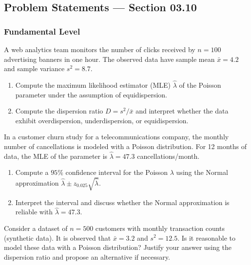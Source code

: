 
\subsection*{Problem Statements --- Section 03.10}

\subsubsection*{Fundamental Level}

\begin{problema}
	\label{prob:3.10.1}
	A web analytics team monitors the number of clicks received by $n = 100$ advertising banners in one hour. The observed data have sample mean $\bar{x} = 4.2$ and sample variance $s^{2} = 8.7$.
	\begin{enumerate}
		\item Compute the maximum likelihood estimator (MLE) $\hat{\lambda}$ of the Poisson parameter under the assumption of equidispersion.
		\item Compute the dispersion ratio $D = s^{2}/\bar{x}$ and interpret whether the data exhibit overdispersion, underdispersion, or equidispersion.
	\end{enumerate}
\end{problema}

\begin{problema}
	\label{prob:3.10.2}
	In a customer churn study for a telecommunications company, the monthly number of cancellations is modeled with a Poisson distribution. For 12 months of data, the MLE of the parameter is $\hat{\lambda} = 47.3$ cancellations/month.
	\begin{enumerate}
		\item Compute a $95\%$ confidence interval for the Poisson $\lambda$ using the Normal approximation $\hat{\lambda} \pm z_{0.025}\sqrt{\hat{\lambda}}$.
		\item Interpret the interval and discuss whether the Normal approximation is reliable with $\hat{\lambda} = 47.3$.
	\end{enumerate}
\end{problema}

\begin{problema}
	\label{prob:3.10.3}
	Consider a dataset of $n = 500$ customers with monthly transaction counts (synthetic data). It is observed that $\bar{x} = 3.2$ and $s^{2} = 12.5$. Is it reasonable to model these data with a Poisson distribution? Justify your answer using the dispersion ratio and propose an alternative if necessary.
\end{problema}

